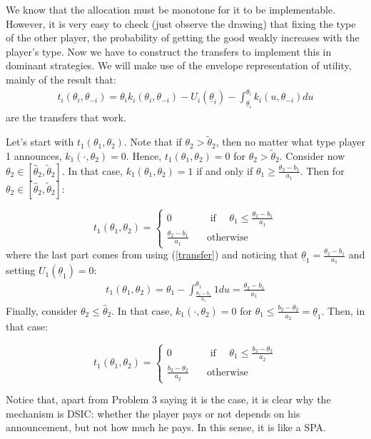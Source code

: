 \documentclass[a4paper]{article}
\begin{document}
We know that the allocation must be monotone for it to be implementable. However, it is very easy to check (just observe the drawing) that fixing the type of the other player, the probability of getting the good weakly increases with the player's type. Now we have to construct the transfers to implement this in dominant strategies. We will make use of the envelope representation of utility, mainly of the result that:
\begin{align} \label{transfer}
	t_i(\theta_i,\theta_{-i}) = \theta_i k_i(\theta_i,\theta_{-i}) - U_i(\underline{\theta}_{i}) - \int_{\underline{\theta}_{i}}^{\theta_i} k_{i} (u,\theta_{-i}) du
\end{align}
are the transfers that work.

Let's start with $t_1(\theta_1,\theta_2)$. Note that if $\theta_2>\tilde{\theta}_2$, then no matter what type player 1 announces, $k_1(\cdot,\theta_2)=0$. Hence, $t_1(\theta_1,\theta_2)=0$ for $\theta_2>\tilde{\theta}_2$. Consider now $\theta_2\in[\hat{\theta}_2,\tilde{\theta}_2]$. In that case, $k_1(\theta_1,\theta_2)=1$ if and only if $\theta_1\geq\frac{\theta_2-b_1}{a_1}$. Then for $\theta_2\in[\hat{\theta}_2,\tilde{\theta}_2]$:

\[t_1(\theta_1,\theta_2)=\left\{\begin{array}{cc} 0 & \quad\text{ if }\quad  \theta_1\leq\frac{\theta_2-b_1}{a_1}\\
	\frac{\theta_2-b_1}{a_1} & \quad\text{otherwise}\quad
	
\end{array}
\right.
\]
where the last part comes from using (\ref{transfer}) and noticing that $\underline{\theta}_1=\frac{\theta_2-b_1}{a_1}$ and setting $U_1(\underline{\theta}_1)=0$:
\begin{align*}
	t_1(\theta_1,\theta_2)=\theta_1-\int_{\frac{\theta_2-b_1}{a_1}}^{\theta_1}1 du=\frac{\theta_2-b_1}{a_1}
\end{align*}
Finally, consider $\theta_2\leq\hat{\theta}_2$. In that case, $k_1(\cdot,\theta_2)=0$ for $\theta_1\leq \frac{b_2-\theta_2}{a_2}=\underline{\theta}_1$. Then, in that case:

\[t_1(\theta_1,\theta_2)=\left\{\begin{array}{cc} 0 & \quad\text{ if }\quad  \theta_1\leq\frac{b_2-\theta_2}{a_2}\\
	\frac{b_2-\theta_2}{a_2} & \quad\text{otherwise}\quad
	
\end{array}
\right.
\]

Notice that, apart from Problem 3 saying it is the case, it is clear why the mechanism is DSIC: whether the player pays or not depends on his announcement, but not how much he pays. In this sense, it is like a SPA.
\end{document}
